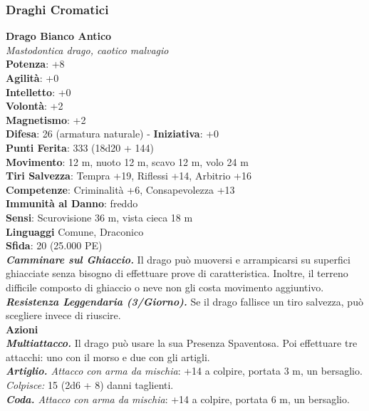\begin{multicols}{2}
\subsubsection{Draghi Cromatici}

\medskip\textbf{Drago Bianco Antico}\\
\emph{Mastodontica drago, caotico malvagio}\\
\textbf{Potenza}: +8\\
\textbf{Agilità}: +0\\
\textbf{Intelletto}: +0\\
\textbf{Volontà}: +2\\
\textbf{Magnetismo}: +2\\
\textbf{Difesa}: 26 (armatura naturale) - \textbf{Iniziativa}: +0\\
\textbf{Punti Ferita}: 333 (18d20 + 144)\\
\textbf{Movimento}: 12 m, nuoto 12 m, scavo 12 m, volo 24 m\\
\textbf{Tiri Salvezza}: Tempra +19, Riflessi +14, Arbitrio +16\\
\textbf{Competenze}: Criminalità +6, Consapevolezza +13\\
\textbf{Immunità al Danno}: freddo\\
\textbf{Sensi}: Scurovisione 36 m, vista cieca 18 m\\
\textbf{Linguaggi} Comune, Draconico\\
\textbf{Sfida}: 20 (25.000 PE)\smallskip\\
\emph{\textbf{Camminare sul Ghiaccio.}} Il drago può muoversi e arrampicarsi su superfici ghiacciate senza bisogno di effettuare prove di caratteristica. Inoltre, il terreno difficile composto di ghiaccio o neve non gli costa movimento aggiuntivo.\\
\emph{\textbf{Resistenza Leggendaria (3/Giorno).}} Se il drago fallisce un tiro salvezza, può scegliere invece di riuscire.\\
\smallskip\textbf{Azioni}\\
\emph{\textbf{Multiattacco.}} Il drago può usare la sua Presenza Spaventosa. Poi effettuare tre attacchi: uno con il morso e due con gli artigli.\\
\emph{\textbf{Artiglio.} Attacco con arma da mischia}: +14 a colpire, portata 3 m, un bersaglio.\\
\emph{Colpisce:} 15 (2d6 + 8) danni taglienti.\\
\emph{\textbf{Coda.} Attacco con arma da mischia}: +14 a colpire, portata 6 m, un bersaglio.\\

\end{multicols}
